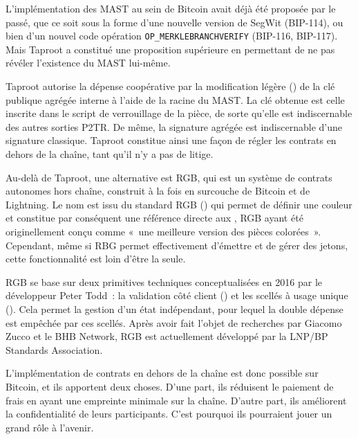 L'implémentation des MAST au sein de Bitcoin avait déjà été proposée par le passé, que ce soit sous la forme d'une nouvelle version de SegWit (BIP-114), ou bien d'un nouvel code opération \texttt{OP\_MERKLEBRANCHVERIFY} (BIP-116, BIP-117). Mais Taproot a constitué une proposition supérieure en permettant de ne pas révéler l'existence du MAST lui-même.

Taproot autorise la dépense coopérative par la modification légère () de la clé publique agrégée interne à l'aide de la racine du MAST. La clé obtenue est celle inscrite dans le script de verrouillage de la pièce, de sorte qu'elle est indiscernable des autres sorties P2TR. De même, la signature agrégée est indiscernable d'une signature classique. Taproot constitue ainsi une façon de régler les contrats en dehors de la chaîne, tant qu'il n'y a pas de litige.

Au-delà de Taproot, une alternative est RGB, qui est un système de contrats autonomes hors chaîne, construit à la fois en surcouche de Bitcoin et de Lightning. Le nom est issu du standard RGB () qui permet de définir une couleur et constitue par conséquent une référence directe aux , RGB ayant été originellement conçu comme «~une meilleure version des pièces colorées~». Cependant, même si RBG permet effectivement d'émettre et de gérer des jetons, cette fonctionnalité est loin d'être la seule.

RGB se base sur deux primitives techniques conceptualisées en 2016 par le développeur Peter Todd~: la validation côté client () et les scellés à usage unique (). Cela permet la gestion d'un état indépendant, pour lequel la double dépense est empêchée par ces scellés. Après avoir fait l'objet de recherches par Giacomo Zucco et le BHB Network, RGB est actuellement développé par la LNP/BP Standards Association.

L'implémentation de contrats en dehors de la chaîne est donc possible sur Bitcoin, et ils apportent deux choses. D'une part, ils réduisent le paiement de frais en ayant une empreinte minimale sur la chaîne. D'autre part, ils améliorent la confidentialité de leurs participants. C'est pourquoi ils pourraient jouer un grand rôle à l'avenir.

